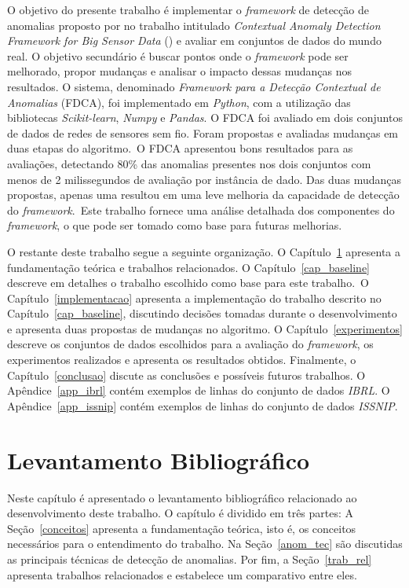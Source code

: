 \documentclass[cic,tc]{iiufrgs}
\begin{document}
O objetivo do presente trabalho é implementar o \textit{framework} de detecção de anomalias proposto por \citeauthor{ContextualMichael2014} no trabalho intitulado \textit{Contextual Anomaly Detection Framework for Big Sensor Data} (\citeyear{ContextualMichael2014}) e avaliar em conjuntos de dados do mundo real. O objetivo secundário é buscar pontos onde o \textit{framework} pode ser melhorado, propor mudanças e analisar o impacto dessas mudanças nos resultados. O sistema, denominado \textit{Framework para a Detecção Contextual de Anomalias} (FDCA), foi implementado em \textit{Python}, com a utilização das bibliotecas \textit{Scikit-learn}, \textit{Numpy} e \textit{Pandas}. O FDCA foi avaliado em dois conjuntos de dados de redes de sensores sem fio. Foram propostas e avaliadas mudanças em duas etapas do algoritmo.~O FDCA apresentou bons resultados para as avaliações, detectando 80\% das anomalias presentes nos dois conjuntos com menos de 2 milissegundos de avaliação por instância de dado. Das duas mudanças propostas, apenas uma resultou em uma leve melhoria da capacidade de detecção do \textit{framework}.~Este trabalho fornece uma análise detalhada dos componentes do \textit{framework}, o que pode ser tomado como base para futuras melhorias.

O restante deste trabalho segue a seguinte organização. O Capítulo~\ref{levantamento} apresenta a fundamentação teórica e trabalhos relacionados. O Capítulo~\ref{cap_baseline} descreve em detalhes o trabalho escolhido como base para este trabalho.~O Capítulo~\ref{implementacao} apresenta a implementação do trabalho descrito no Capítulo~\ref{cap_baseline}, discutindo decisões tomadas durante o desenvolvimento e apresenta duas propostas de mudanças no algoritmo. O Capítulo~\ref{experimentos} descreve os conjuntos de dados escolhidos para a avaliação do \textit{framework}, os experimentos realizados e apresenta os resultados obtidos. Finalmente, o Capítulo~\ref{conclusao} discute as conclusões e possíveis futuros trabalhos. O Apêndice~\ref{app_ibrl} contém exemplos de linhas do conjunto de dados \textit{IBRL}. O Apêndice~\ref{app_issnip} contém exemplos de linhas do conjunto de dados \textit{ISSNIP}.

\chapter{Levantamento Bibliográfico}
\label{levantamento}
Neste capítulo é apresentado o levantamento bibliográfico relacionado ao desenvolvimento deste trabalho. O capítulo é dividido em três partes: A Seção~\ref{conceitos} apresenta a fundamentação teórica, isto é, os conceitos necessários para o entendimento do trabalho. Na Seção~\ref{anom_tec} são discutidas as principais técnicas de detecção de anomalias. Por fim, a Seção~\ref{trab_rel} apresenta trabalhos relacionados e estabelece um comparativo entre eles.
\end{document}
